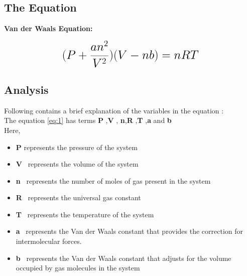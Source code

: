 \subsection{The Equation}

\textbf{Van der Waals Equation:}  

\begin{equation}
 {\LARGE{\textbf{$(P + \frac{an^2}{V^2})(V-nb) = nRT$}}}
 \label{eq:1}
\end{equation}


\subsection{Analysis}
Following contains a brief explanation of the variables in the equation : \\
\normalsize{The equation \ref{eq:1}  has terms \textbf{P} ,\textbf{V} , \textbf{n},\textbf{R} ,\textbf{T} ,\textbf{a} and \textbf{b}}\\
{\normalsize {Here,}}\\
\begin{itemize}
\item{\normalsize {\textbf{P} represents the pressure of the system  }}\\
\item{\normalsize {\textbf{V} \  represents the volume of the system}}\\
\item{\normalsize {\textbf{n} \  represents the number of moles of gas present in the system}}\\
\item{\normalsize {\textbf{R} \  represents the universal gas constant}}\\
\item{\normalsize{\textbf{T} \ represents the temperature of the system}}\\
\item{\normalsize{\textbf{a} \ represents the Van der Waals constant that provides the correction for intermolecular forces.}}\\
\item{\normalsize{\textbf{b} \ represents the Van der Waals constant that adjusts for the volume occupied by gas molecules in the system}}
\end{itemize}


